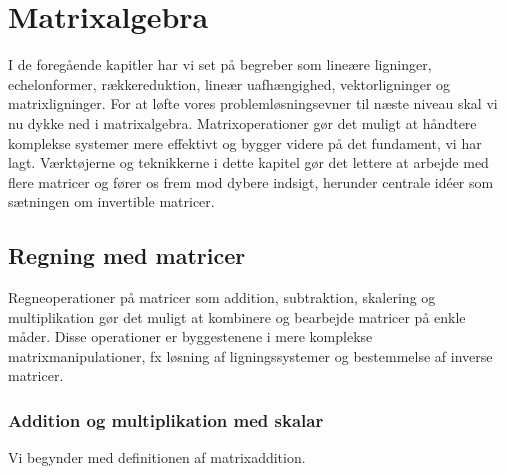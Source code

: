 \chapter{Matrixalgebra}\label{chap:ch9}

I de foregående kapitler har vi set på begreber som lineære ligninger, echelonformer, rækkereduktion, lineær uafhængighed, vektorligninger og matrixligninger. For at løfte vores problemløsningsevner til næste niveau skal vi nu dykke ned i matrixalgebra. Matrixoperationer gør det muligt at håndtere komplekse systemer mere effektivt og bygger videre på det fundament, vi har lagt. Værktøjerne og teknikkerne i dette kapitel gør det lettere at arbejde med flere matricer og fører os frem mod dybere indsigt, herunder centrale idéer som sætningen om invertible matricer.

\section{Regning med matricer}
Regneoperationer på matricer som addition, subtraktion, skalering og multiplikation gør det muligt at kombinere og bearbejde matricer på enkle måder. Disse operationer er byggestenene i mere komplekse matrixmanipulationer, fx løsning af ligningssystemer og bestemmelse af inverse matricer.


\subsection*{Addition og multiplikation med skalar}
Vi begynder med definitionen af matrixaddition.

